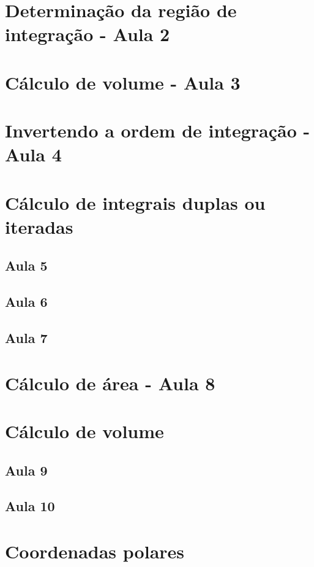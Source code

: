 \documentclass[
	12pt,				%
	openright,			%
	twoside,			%
	a4paper,			%
	english,			%
	french,				%
	spanish,			%
	brazil,				%
]{abntex2}
\begin{document}
\section{Determinação da região de integração - Aula 2}		
			
\section{Cálculo de volume - Aula 3}
			
\section{Invertendo a ordem de integração - Aula 4}
			
\section{Cálculo de integrais duplas ou iteradas}
	\subsection{Aula 5}
				
	\subsection{Aula 6}
				
	\subsection{Aula 7}
				
	\section{Cálculo de área - Aula 8}
				
	\section{Cálculo de volume}
		\subsection{Aula 9}
					
		\subsection{Aula 10}
				
\section{Coordenadas polares}		
\end{document}
